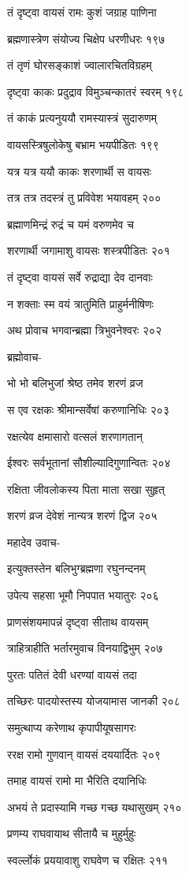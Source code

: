 तं दृष्ट्वा वायसं रामः कुशं जग्राह पाणिना

ब्रह्मणास्त्रेण संयोज्य चिक्षेप धरणीधरः १९७

तं तृणं घोरसङ्काशं ज्वालारचितविग्रहम्

दृष्ट्वा काकः प्रदुद्राव विमुञ्चन्कातरं स्वरम् १९८

तं काकं प्रत्यनुययौ रामस्यास्त्रं सुदारुणम्

वायसस्त्रिषुलोकेषु बभ्राम भयपीडितः १९९

यत्र यत्र ययौ काकः शरणार्थी स वायसः

तत्र तत्र तदस्त्रं तु प्रविवेश भयावहम् २००

ब्रह्माणमिन्द्रं रुद्रं च यमं वरुणमेव च

शरणार्थी जगामाशु वायसः शस्त्रपीडितः २०१

तं दृष्ट्वा वायसं सर्वे रुद्राद्या देव दानवाः

न शक्ताः स्म वयं त्रातुमिति प्राहुर्मनीषिणः

अथ प्रोवाच भगवान्ब्रह्मा त्रिभुवनेश्वरः २०२

ब्रह्मोवाच-

भो भो बलिभुजां श्रेष्ठ तमेव शरणं व्रज

स एव रक्षकः श्रीमान्सर्वेषां करुणानिधिः २०३

रक्षत्येव क्षमासारो वत्सलं शरणागतान्

ईश्वरः सर्वभूतानां सौशील्यादिगुणान्वितः २०४

रक्षिता जीवलोकस्य पिता माता सखा सुहृत्

शरणं व्रज देवेशं नान्यत्र शरणं द्विज २०५

महादेव उवाच-

इत्युक्तस्तेन बलिभुग्ब्रह्मणा रघुनन्दनम्

उपेत्य सहसा भूमौ निपपात भयातुरः २०६

प्राणसंशयमापन्नं दृष्ट्वा सीताथ वायसम्

त्राहित्राहीति भर्तारमुवाच विनयाद्विभुम् २०७

पुरतः पतितं देवी धरण्यां वायसं तदा

तच्छिरः पादयोस्तस्य योजयामास जानकी २०८

समुत्थाप्य करेणाथ कृपापीयूषसागरः

ररक्ष रामो गुणवान् वायसं दययार्दितः २०९

तमाह वायसं रामो मा भैरिति दयानिधिः

अभयं ते प्रदास्यामि गच्छ गच्छ यथासुखम् २१०

प्रणम्य राघवायाथ सीतायै च मुहुर्मुहुः

स्वर्ल्लोकं प्रययावाशु राघवेण च रक्षितः २११

